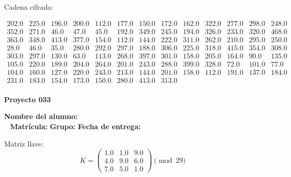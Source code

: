\documentclass[12pt]{article}
\begin{document}
Cadena cifrada:
\begin{center}
$\begin{array}{lllllllllllll}
202.0 & 225.0 & 196.0 & 200.0 & 112.0 & 177.0 & 150.0 & 172.0 & 162.0 & 322.0 & 277.0 & 298.0 & 248.0\\
352.0 & 271.0 & 46.0 & 47.0 & 45.0 & 192.0 & 349.0 & 245.0 & 194.0 & 326.0 & 233.0 & 320.0 & 468.0\\
363.0 & 348.0 & 413.0 & 377.0 & 154.0 & 112.0 & 144.0 & 222.0 & 311.0 & 262.0 & 210.0 & 295.0 & 250.0\\
28.0 & 46.0 & 35.0 & 280.0 & 292.0 & 297.0 & 188.0 & 306.0 & 225.0 & 318.0 & 415.0 & 354.0 & 308.0\\
303.0 & 297.0 & 130.0 & 63.0 & 113.0 & 268.0 & 397.0 & 301.0 & 158.0 & 205.0 & 164.0 & 90.0 & 135.0\\
105.0 & 220.0 & 189.0 & 204.0 & 264.0 & 201.0 & 243.0 & 288.0 & 399.0 & 328.0 & 72.0 & 101.0 & 77.0\\
104.0 & 160.0 & 127.0 & 220.0 & 243.0 & 213.0 & 144.0 & 201.0 & 158.0 & 112.0 & 191.0 & 137.0 & 184.0\\
231.0 & 183.0 & 154.0 & 173.0 & 150.0 & 280.0 & 413.0 & 313.0\\
\end{array}$
\end{center}

\newpage


\textbf{Proyecto 033}

\textbf{Nombre del alumno:} \underline{\hspace{13cm}}\\\
\vspace{1cm}
\textbf{Matrícula:} \underline{\hspace{4cm}} \hspace{1cm}
\textbf{Grupo:} \underline{\hspace{2cm}}
\textbf{Fecha de entrega:} \underline{\hspace{2cm}}

\medskip

Matriz llave:
\[
K = \begin{pmatrix}
1.0 & 1.0 & 9.0\\
4.0 & 9.0 & 6.0\\
7.0 & 5.0 & 1.0
\end{pmatrix} \pmod{29}
\]
\end{document}
